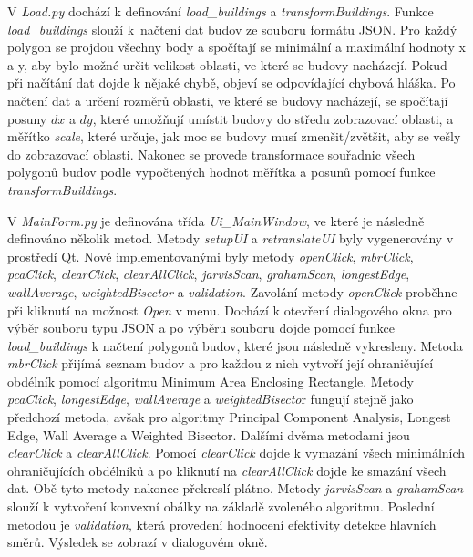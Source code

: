 \documentclass{article}
\begin{document}
\begin{spacing}{1.5}
V \textit{Load.py} dochází k definování \textit{load\_buildings} a \textit{transformBuildings}. Funkce \textit{load\_buildings} slouží k~načtení dat budov ze souboru formátu JSON. Pro každý polygon se projdou všechny body a spočítají se minimální a maximální hodnoty x a y, aby bylo možné určit velikost oblasti, ve které se budovy nacházejí. Pokud při načítání dat dojde k nějaké chybě, objeví se odpovídající chybová hláška. Po načtení dat a určení rozměrů oblasti, ve které se budovy nacházejí, se spočítají posuny $dx$ a $dy$, které umožňují umístit budovy do středu zobrazovací oblasti, a měřítko \textit{scale}, které určuje, jak moc se budovy musí zmenšit/zvětšit, aby se vešly do zobrazovací oblasti. Nakonec se provede transformace souřadnic všech polygonů budov podle vypočtených hodnot měřítka a posunů pomocí funkce \textit{transformBuildings}.

V \textit{MainForm.py} je definována třída \textit{Ui\_MainWindow}, ve které je následně definováno několik metod. Metody \textit{setupUI} a \textit{retranslateUI} byly vygenerovány v prostředí Qt. Nově implementovanými byly metody \textit{openClick}, \textit{mbrClick}, \textit{pcaClick}, \textit{clearClick}, \textit{clearAllClick}, \textit{jarvisScan}, \textit{grahamScan}, \textit{longestEdge}, \textit{wallAverage}, \textit{weightedBisector} a \textit{validation}. Zavolání metody \textit{openClick} proběhne při kliknutí na možnost \textit{Open} v menu. Dochází k otevření dialogového okna pro výběr souboru typu JSON a po výběru souboru dojde pomocí funkce \textit{load\_buildings} k načtení polygonů budov, které jsou následně vykresleny. Metoda \textit{mbrClick} přijímá seznam budov a pro každou z nich vytvoří její ohraničující obdélník pomocí algoritmu Minimum Area Enclosing Rectangle. Metody \textit{pcaClick}, \textit{longestEdge}, \textit{wallAverage} a \textit{weightedBisecto}r fungují stejně jako předchozí metoda, avšak pro algoritmy Principal Component Analysis, Longest Edge, Wall Average a Weighted Bisector. Dalšími dvěma metodami jsou \textit{clearClick} a \textit{clearAllClick}. Pomocí \textit{clearClick} dojde k vymazání všech minimálních ohraničujících obdélníků a po kliknutí na \textit{clearAllClick} dojde ke smazání všech dat. Obě tyto metody nakonec překreslí plátno. Metody \textit{jarvisScan} a \textit{grahamScan} slouží k vytvoření konvexní obálky na základě zvoleného algoritmu. Poslední metodou je \textit{validation}, která provedení hodnocení efektivity detekce hlavních směrů. Výsledek se zobrazí v dialogovém okně. 


\end{spacing}
\end{document}
